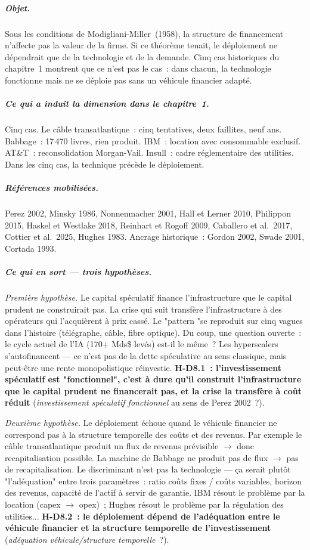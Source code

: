 \subparagraph{Objet.}
Sous les conditions de Modigliani-Miller~(1958), la structure de financement n'affecte pas la valeur de la firme. Si ce th\'eor\`eme tenait, le d\'eploiement ne d\'ependrait que de la technologie et de la demande. Cinq cas historiques du chapitre~1 montrent que ce n'est pas le cas~: dans chacun, la technologie fonctionne mais ne se d\'eploie pas sans un v\'ehicule financier adapt\'e.

\subparagraph{Ce qui a induit la dimension dans le chapitre~1.}
Cinq cas. Le c\^able transatlantique~: cinq tentatives, deux faillites, neuf ans. Babbage~: 17\,470 livres, rien produit. IBM~: location avec consommable exclusif. AT\&T~: reconsolidation Morgan-Vail. Insull~: cadre r\'eglementaire des utilities. Dans les cinq cas, la technique pr\'ec\`ede le d\'eploiement.

\subparagraph{R\'ef\'erences mobilis\'ees.}
Perez 2002, Minsky 1986, Nonnenmacher 2001, Hall et Lerner 2010, Philippon 2015, Haskel et Westlake 2018, Reinhart et Rogoff 2009, Caballero et al.\ 2017, Cottier et al.\ 2025, Hughes 1983. Ancrage historique~: Gordon 2002, Swade 2001, Cortada 1993.

\subparagraph{Ce qui en sort --- trois hypoth\`eses.}

\emph{Premi\`ere hypoth\`ese.} Le capital sp\'eculatif finance l'infrastructure que le capital prudent ne construirait pas. La crise qui suit transf\`ere l'infrastructure \`a des op\'erateurs qui l'acqui\`erent \`a prix cass\'e. Le "pattern "se reproduit sur cinq vagues dans l'histoire (t\'el\'egraphe, c\^able, fibre optique). Du coup, une question ouverte~: le cycle actuel de l'IA (170+ Mds\$ lev\'es) est-il le m\^eme~? Les hyperscalers s'autofinancent --- ce n'est pas de la dette sp\'eculative au sens classique, mais peut-\^etre une rente monopolistique r\'einvestie. \textbf{H-D8.1~: l'investissement sp\'eculatif est "fonctionnel", c'est à dure qu'il construit l'infrastructure que le capital prudent ne financerait pas, et la crise la transf\`ere \`a co\^ut r\'eduit} (\emph{investissement sp\'eculatif fonctionnel} au sens de Perez 2002~?).

\emph{Deuxi\`eme hypoth\`ese.} Le d\'eploiement \'echoue quand le v\'ehicule financier ne correspond pas \`a la structure temporelle des co\^uts et des revenus. Par exemple le c\^able transatlantique produit un flux de revenus pr\'evisible $\to$ donc recapitalisation possible. La machine de Babbage ne produit pas de flux $\to$ pas de recapitalisation. Le discriminant n'est pas la technologie --- ça serait plutôt "l'ad\'equation" entre trois param\`etres~: ratio co\^uts fixes / co\^uts variables, horizon des revenus, capacit\'e de l'actif \`a servir de garantie. IBM r\'esout le probl\`eme par la location (capex $\to$ opex)~; Hughes r\'esout le probl\`eme par la r\'egulation des utilities... \textbf{H-D8.2~: le d\'eploiement d\'epend de l'ad\'equation entre le v\'ehicule financier et la structure temporelle de l'investissement} (\emph{ad\'equation v\'ehicule/structure temporelle}~?).

